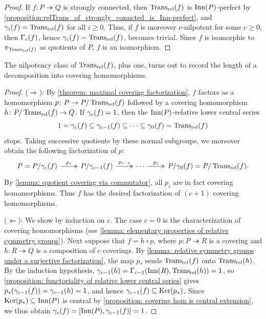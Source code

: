 \begin{proof}
    If $f\colon P \twoheadrightarrow Q$ is strongly connected, then $\operatorname{Trans_{rel}}(f)$ is $\operatorname{Inn}(P)$-perfect by \cref{proposition:relTrans_of_strongly_conncted_is_Inn-perfect}, and $\gamma_{i}(f)=\operatorname{Trans_{rel}}(f)$ for all $i\geq 0$. Thus, if $f$ is moreover $c$-nilpotent for some $c\geq 0$, then $\Gamma_{c}(f)$, hence $\gamma_{c}(f)=\operatorname{Trans_{rel}}(f)$, becomes trivial.
    Since $f$ is isomorphic to $\pi_{\operatorname{Trans_{rel}}(f)}$ as quotients of $P$, $f$ is an isomorphism.
\end{proof}


The nilpotency class of $\operatorname{Trans_{rel}}(f)$, plus one, turns out to record the length of a decomposition into covering homomorphisms.




\begin{proof}
($\Rightarrow$): By \cref{theorem: maximal covering factorization}, $f$ factors as a homomorphism $p\colon P\to P/\operatorname{Trans_{rel}}(f)$ followed by a covering homomorphism $h\colon P/\operatorname{Trans_{rel}}(f) \to Q$.
If $\gamma_{c}(f)=1$, then the $\operatorname{Inn}(P)$-relative lower central series
\[ 1= \gamma_{c}(f) \subseteq \gamma_{c-1}(f) \subseteq \cdots \subseteq \gamma_{0}(f) = \operatorname{Trans_{rel}}(f) \]
stops. Taking successive quotients by these normal subgroups, we moreover obtain the following factorization of $p$:
\[
\begin{tikzcd}
    P=P/\relTransLCS{c}{f}
    \arrow[two heads]{r}{p_c}
    &
    P/\relTransLCS{c-1}{f}
    \arrow[two heads]{r}{p_{c-1}}
    &
    \cdots
    \arrow[two heads]{r}{p_1}
    &
    P/\relTransLCS{0}{f}= P/\relTrans(f).
\end{tikzcd}
\]
By \cref{lemma: quotient covering via commutator}, all $p_i$ are in fact covering homomorphisms. Thus $f$ has the desired factorization of $(c+1)$ covering homomorphisms.

($\Leftarrow$): We show by induction on $c$. The case $c=0$ is the characterization of covering homomorphisms (see \cref{lemma: elementary properties of relative symmetry groups}). Next suppose that $f=h\circ p$, where $p\colon P\twoheadrightarrow R$ is a covering and $h\colon R\twoheadrightarrow Q$ is a composition of $c$ coverings. By \cref{lemma: relative symmetry groups under a surjective factorization}, the map $p_*$ sends $\operatorname{Trans_{rel}}(f)$ onto $\operatorname{Trans_{rel}}(h)$. By the induction hypothesis, $\gamma_{c-1}(h)=\Gamma_{c-1}(\operatorname{Inn}(R),\operatorname{Trans_{rel}}(h))=1$, so \cref{proposition: functoriality of relative lower central series} gives $p_*(\gamma_{c-1}(f))=\gamma_{c-1}(h)=1$, and hence $\gamma_{c-1}(f)\subseteq\operatorname{Ker}(p_*)$. Since $\operatorname{Ker}(p_*)\subseteq \operatorname{Inn}(P)$ is central by \cref{proposition: covering hom is central extension}, we thus obtain $\gamma_{c}(f)=[\operatorname{Inn}(P),\gamma_{c-1}(f)]=1$.
\end{proof}


